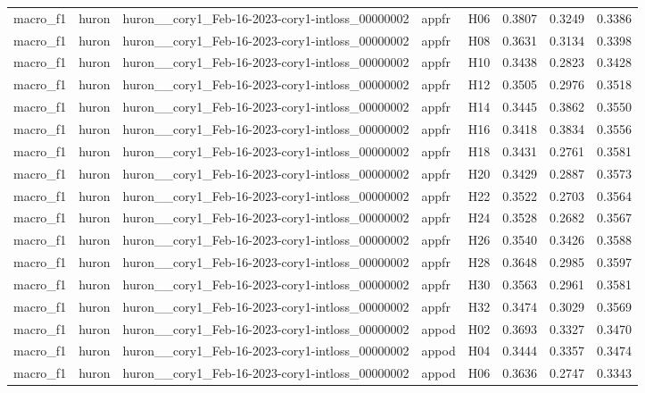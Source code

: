\begin{table}[tbp]
\begin{tabular}{lllllrrr}
macro\_f1 & huron & huron\_\_cory1\_Feb-16-2023-cory1-intloss\_00000002 & appfr & H06 & 0.3807 & 0.3249 & 0.3386 \\
macro\_f1 & huron & huron\_\_cory1\_Feb-16-2023-cory1-intloss\_00000002 & appfr & H08 & 0.3631 & 0.3134 & 0.3398 \\
macro\_f1 & huron & huron\_\_cory1\_Feb-16-2023-cory1-intloss\_00000002 & appfr & H10 & 0.3438 & 0.2823 & 0.3428 \\
macro\_f1 & huron & huron\_\_cory1\_Feb-16-2023-cory1-intloss\_00000002 & appfr & H12 & 0.3505 & 0.2976 & 0.3518 \\
macro\_f1 & huron & huron\_\_cory1\_Feb-16-2023-cory1-intloss\_00000002 & appfr & H14 & 0.3445 & 0.3862 & 0.3550 \\
macro\_f1 & huron & huron\_\_cory1\_Feb-16-2023-cory1-intloss\_00000002 & appfr & H16 & 0.3418 & 0.3834 & 0.3556 \\
macro\_f1 & huron & huron\_\_cory1\_Feb-16-2023-cory1-intloss\_00000002 & appfr & H18 & 0.3431 & 0.2761 & 0.3581 \\
macro\_f1 & huron & huron\_\_cory1\_Feb-16-2023-cory1-intloss\_00000002 & appfr & H20 & 0.3429 & 0.2887 & 0.3573 \\
macro\_f1 & huron & huron\_\_cory1\_Feb-16-2023-cory1-intloss\_00000002 & appfr & H22 & 0.3522 & 0.2703 & 0.3564 \\
macro\_f1 & huron & huron\_\_cory1\_Feb-16-2023-cory1-intloss\_00000002 & appfr & H24 & 0.3528 & 0.2682 & 0.3567 \\
macro\_f1 & huron & huron\_\_cory1\_Feb-16-2023-cory1-intloss\_00000002 & appfr & H26 & 0.3540 & 0.3426 & 0.3588 \\
macro\_f1 & huron & huron\_\_cory1\_Feb-16-2023-cory1-intloss\_00000002 & appfr & H28 & 0.3648 & 0.2985 & 0.3597 \\
macro\_f1 & huron & huron\_\_cory1\_Feb-16-2023-cory1-intloss\_00000002 & appfr & H30 & 0.3563 & 0.2961 & 0.3581 \\
macro\_f1 & huron & huron\_\_cory1\_Feb-16-2023-cory1-intloss\_00000002 & appfr & H32 & 0.3474 & 0.3029 & 0.3569 \\
macro\_f1 & huron & huron\_\_cory1\_Feb-16-2023-cory1-intloss\_00000002 & appod & H02 & 0.3693 & 0.3327 & 0.3470 \\
macro\_f1 & huron & huron\_\_cory1\_Feb-16-2023-cory1-intloss\_00000002 & appod & H04 & 0.3444 & 0.3357 & 0.3474 \\
macro\_f1 & huron & huron\_\_cory1\_Feb-16-2023-cory1-intloss\_00000002 & appod & H06 & 0.3636 & 0.2747 & 0.3343 \\

\end{tabular}
\end{table}
